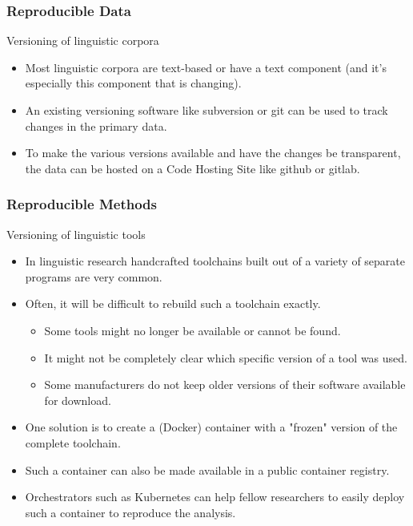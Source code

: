    \begin{frame}
        \frametitle{Reproducible Data}
        \begin{block}{Versioning of linguistic corpora}
            \begin{itemize}
				\item Most linguistic corpora are text-based or have a text component (and it's especially this component that is changing).
				\pause
				\item An existing versioning software like subversion or git can be used to track changes in the primary data.
				\pause
				\item To make the various versions available and have the changes be transparent, the data can be hosted on a Code Hosting Site like github or gitlab.
	     	\end{itemize}
        \end{block}
    \end{frame}

    \begin{frame}
        \frametitle{Reproducible Methods}
        \begin{block}{Versioning of linguistic tools}
            \begin{itemize}
				\item In linguistic research handcrafted toolchains built out of a variety of separate programs are very common.
				\pause
				\item Often, it will be difficult to rebuild such a toolchain exactly.
				\pause
				\begin{itemize}
					\item Some tools might no longer be available or cannot be found.
					\pause
					\item It might not be completely clear which specific version of a tool was used.
					\pause
					\item Some manufacturers do not keep older versions of their software available for download.
				\end{itemize}
				\pause
				\item One solution is to create a (Docker) container with a "frozen" version of the complete toolchain.
				\pause
				\item Such a container can also be made available in a public container registry.
				\pause
				\item Orchestrators such as Kubernetes can help fellow researchers to easily deploy such a container to reproduce the analysis.
	     	\end{itemize}
        \end{block}
    \end{frame}

